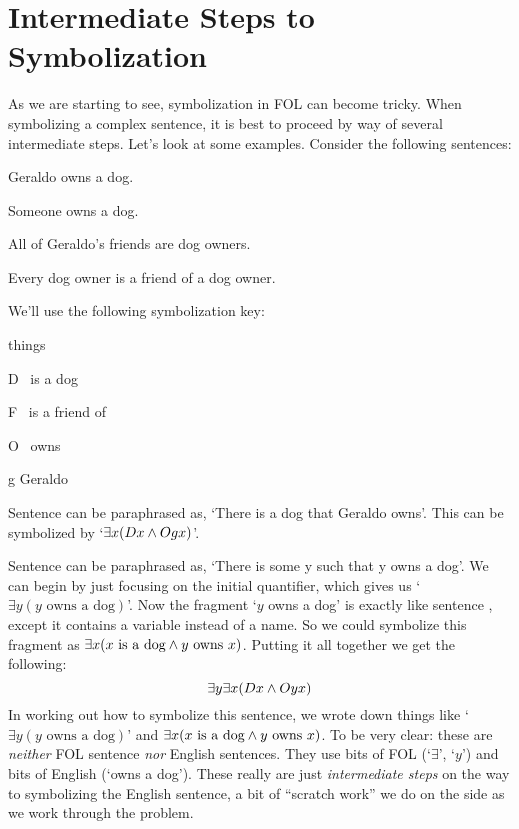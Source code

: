 \section{Intermediate Steps to Symbolization}\label{s:FOLSymSteps}
As we are starting to see, symbolization in FOL can become tricky. When symbolizing a complex sentence, it is best to proceed by way of several intermediate steps. Let's look at some examples. Consider the following sentences:
\begin{earg}
\item[\ex{dog2}] Geraldo owns a dog.
\item[\ex{dog3}] Someone owns a dog.
\item[\ex{dog4}] All of Geraldo's friends are dog owners.
\item[\ex{dog5}] Every dog owner is a friend of a dog owner.
\end{earg}
We'll use the following symbolization key:
\begin{ekey}
\item[\text{domain}] things
\item[D] \blank\ is a dog
\item[F] \blank\ is a friend of \blank
\item[O] \blank\ owns \blank
\item[g] Geraldo
\end{ekey}

Sentence  can be paraphrased as, `There is a dog that Geraldo owns'. This can be symbolized by `$\exists x(Dx \wedge Ogx)$'.

Sentence  can be paraphrased as, `There is some y such that y owns a dog'.   We can begin by just focusing on the initial quantifier, which gives us `$\exists y(y\text{ owns a dog})$'. Now the fragment `$y$ owns a dog' is exactly like sentence , except it contains a variable instead of a name.  So we could symbolize this fragment as $\exists x(x \text{ is a dog} \wedge y \text{ owns } x)$. Putting it all together we get the following:
$$\exists y \exists x(Dx \wedge Oyx)$$
In working out how to symbolize this sentence, we wrote down things like `$\exists y(y\text{ owns a dog})$' and $\exists x(x \text{ is a dog} \wedge y \text{ owns } x)$. To be very clear: these are \emph{neither} FOL sentence \emph{nor} English sentences.  They use bits of FOL (`$\exists$', `$y$') and bits of English (`owns a dog'). These really are just \emph{intermediate steps} on the way to symbolizing the English sentence, a bit of ``scratch work'' we do on the side as we work through the problem.

